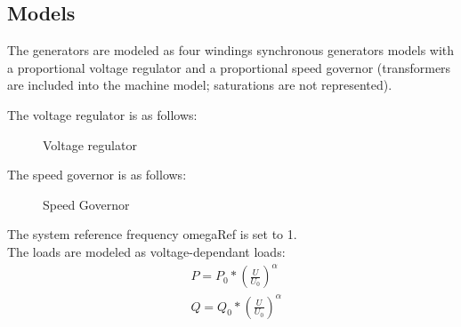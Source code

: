 \documentclass[a4paper, 12pt]{report}
\begin{document}
\subsection{Models}

The generators are modeled as four windings synchronous generators models with a proportional voltage regulator and a proportional speed governor (transformers are included into the machine model; saturations are not represented).

The voltage regulator is as follows:
\begin{figure}[H]
\centering
{}
\caption{Voltage regulator}
\end{figure}

The speed governor is as follows:
\begin{figure}[H]
\centering
{}
\caption{Speed Governor}
\end{figure}

The system reference frequency omegaRef is set to 1.\\

The loads are modeled as voltage-dependant loads:
\begin{equation*}
\begin{aligned}
& P = P_{0} * (\frac{U}{U_{0}})^\alpha \\
& Q = Q_{0} * (\frac{U}{U_{0}})^\alpha
\end{aligned}
\label{Voltage-dependant load model}
\end{equation*}
\end{document}
